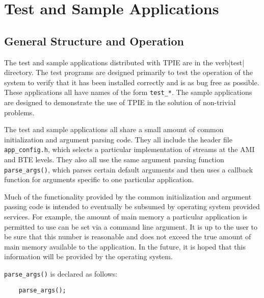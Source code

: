 \chapter{Test and Sample Applications}

\section{General Structure and Operation}

The test and sample applications distributed with TPIE are in the
verb|test| directory.  The test programs are designed primarily to
test the operation of the system to verify that it has been installed
correctly and is as bug free as possible.  These applications all have
names of the form \verb|test_*|.  The sample applications are designed
to demonstrate the use of TPIE in the solution of non-trivial
problems.

The test and sample applications all share a small amount of common
initialization and argument parsing code.  They all include the header
file \verb|app_config.h|, which selects a particular implementation of
streams at the AMI and BTE levels.  They
also all use the same argument parsing function \verb|parse_args()|,
which parses certain default arguments and then uses a callback
function for arguments specific to one particular application.

Much of the functionality provided by the common initialization and
argument passing code is intended to eventually be subsumed by
operating system provided services.  For example, the amount of main
memory a particular application is permitted to use can be set via a
command line argument.  It is up to the user to be sure that this
number is reasonable and does not exceed the true amount of main
memory available to the application.  In the future, it is hoped that
this information will be provided by the operating system.

\verb|parse_args()| is declared as follows:

\begin{verbatim}
    parse_args();
\end{verbatim}



